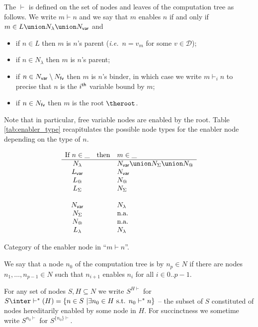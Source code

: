 \begin{definition}[Enabling]
The  $\vdash$ is defined on the set of
nodes and leaves of the computation tree as follows. We write $m \vdash n$ and
we say that $m$ enables $n$ if and only if
$m \in L \union N_\lambda \union N_{\sf var}$ and
\begin{itemize}
\item if $n \in L$ then $m$ is $n$'s parent ({\it i.e.}\ $n=v_m$ for some $v\in\mathcal{D}$);
\item if $n\in N_\lambda$ then $m$ is $n$'s parent;
\item if $n \in N_{\sf var} \setminus N_{\sf fv}$ then
        $m$ is $n$'s binder, in which case we write $m \vdash_i n$ to precise that $n$ is the $i^{\sf th}$ variable bound by $m$;
\item if $n \in N_{\sf fv}$ then $m$ is the root $\theroot$.
\end{itemize}
Note that in particular, free variable nodes are enabled by the root.
Table \ref{tab:enabler_type} recapitulates the possible node types for the enabler node depending on the type of $n$.
\end{definition}


\begin{table}[htbp]
$$
\begin{array}{ccl}
\mbox{If } n\in \_  & \mbox{then} & m\in \_ \\ \hline
N_\lambda & & N_{\sf var} \union N_\Sigma \union N_@ \\
L_{\sf var} & & N_{\sf var} \\
L_@ & &  N_@ \\
L_\Sigma & & N_\Sigma\\
\\
N_{\sf var} & & N_\lambda\\
N_\Sigma & & \mbox{n.a.} \\
N_@ & & \mbox{n.a.} \\
L_\lambda & & N_\lambda\\
\end{array}
$$
\caption[Category of the justifying node]{Category of the enabler node in ``$m\vdash n$''.}
\label{tab:enabler_type}
\end{table}

We say that a node $n_0$ of the computation tree is  by $n_p \in N$ if there are nodes $n_1,\ldots, n_{p-1} \in N$ such that $n_{i+1}$ enables $n_{i}$
for all $i\in 0..p-1$.

For any set of nodes $S, H \subseteq N$ we write $S^{H\vdash}$ for $S \inter \vdash^*(H) = \{ n \in S \ | \exists n_0 \in H \mbox{ s.t. }n_0  \vdash^* n \}$ -- the subset of $S$ constituted of nodes hereditarily enabled by some node in $H$. For succinctness we sometime write $S^{n_0\vdash}$ for
$S^{\{n_0\}\vdash}$.

